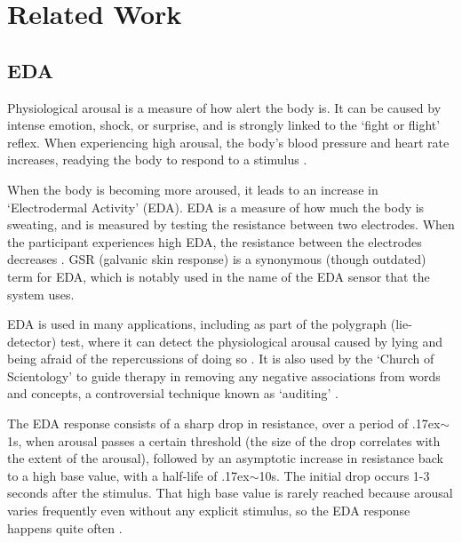 \documentclass[12pt,a4paper]{article}\usepackage[]{graphicx}\usepackage[]{color}
\begin{document}
\section{Related Work}

\subsection{EDA}
Physiological arousal is a measure of how alert the body is. It can be caused by intense emotion, shock, or surprise, and is strongly linked to the `fight or flight' reflex. When experiencing high arousal, the body's blood pressure and heart rate increases, readying the body to respond to a stimulus \citet[pp.162-167]{arousal}.

When the body is becoming more aroused, it leads to an increase in `Electrodermal Activity' (EDA). EDA is a measure of how much the body is sweating, and is measured by testing the resistance between two electrodes. When the participant experiences high EDA, the resistance between the electrodes decreases \citet[pp.2-3]{eda}. GSR (galvanic skin response) is a synonymous (though outdated) term for EDA, which is notably used in the name of the EDA sensor that the system uses.

EDA is used in many applications, including as part of the polygraph (lie-detector) test, where it can detect the physiological arousal caused by lying and being afraid of the repercussions of doing so \citet{polygraph}. It is also used by the `Church of Scientology' to guide therapy in removing any negative associations from words and concepts, a controversial technique known as `auditing' \citet[p.32]{auditing}.

The EDA response consists of a sharp drop in resistance, over a period of {\raise.17ex\hbox{$\scriptstyle\sim$}}1s, when arousal passes a certain threshold (the size of the drop correlates with the extent of the arousal), followed by an asymptotic increase in resistance back to a high base value, with a half-life of {\raise.17ex\hbox{$\scriptstyle\sim$}}10s. The initial drop occurs 1-3 seconds after the stimulus. That high base value is rarely reached because arousal varies frequently even without any explicit stimulus, so the EDA response happens quite often \citet{edaAnalysis}.
\end{document}
